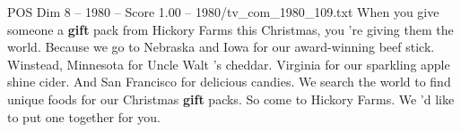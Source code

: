 \begin{textsample}{POS Dim 8 – 1980 – Score 1.00 – 1980/tv\_com\_1980\_109.txt}  \label{ex:f8_pos_044}
When you give someone a \textbf{gift} pack from Hickory Farms this Christmas, you 're giving them the world.
Because we go to Nebraska and Iowa for our award-winning beef stick.
Winstead, Minnesota for Uncle Walt 's cheddar.
Virginia for our sparkling apple shine cider.
And San Francisco for delicious candies.
We search the world to find unique foods for our Christmas \textbf{gift} packs.
So come to Hickory Farms.
We 'd like to put one together for you.

\end{textsample}
